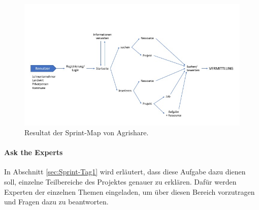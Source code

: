 \begin{figure}[h!]
	\includegraphics[width=\textwidth]{99_IMG/03_Umsetzung/map.jpg}
	\caption{Resultat der Sprint-Map von Agrishare.}
	\label{fig:map}
\end{figure}
%

\paragraph{Ask the Experts}
In Abschnitt \ref{sec:Sprint-Tag1} wird erläutert, dass diese Aufgabe dazu dienen soll, einzelne Teilbereiche des Projektes genauer zu erklären. Dafür werden Experten der einzelnen Themen eingeladen, um über diesen Bereich vorzutragen und Fragen dazu zu beantworten. 

